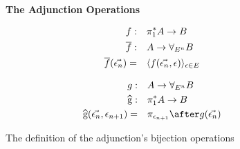 \documentclass{Report}
\begin{document}
\begin{figure}
    \begin{framed}
        \centering
        \textbf{The Adjunction Operations}

        \begin{minipage}{0.45\linewidth}
            \begin{align*}
                f:&\quad \pi_1^* A \rightarrow B\\
                \overline{f}:&\quad A\rightarrow \forall_{E^n} B\\
                \overline{f}(\vec{\epsilon_n}) =&\quad \langle f(\vec{\epsilon_n}, \epsilon)\rangle_{\epsilon\in E}
            \end{align*}
        \end{minipage}
        \quad
        \begin{minipage}{0.45\linewidth}
            
        \begin{align*}
            g:&\quad A \rightarrow \allEn B\\
            \widehat{g}:&\quad \pstar A\rightarrow B\\
            \widehat{g}(\env, \e_{n+1}) =&\quad\pi_{\e_{n+1}}\after g(\env)
        \end{align*}
        \end{minipage}
    \end{framed}

    \caption{The definition of the adjunction's bijection operations}
    \label{AdjunctionDefinition}
\end{figure}
\end{document}
